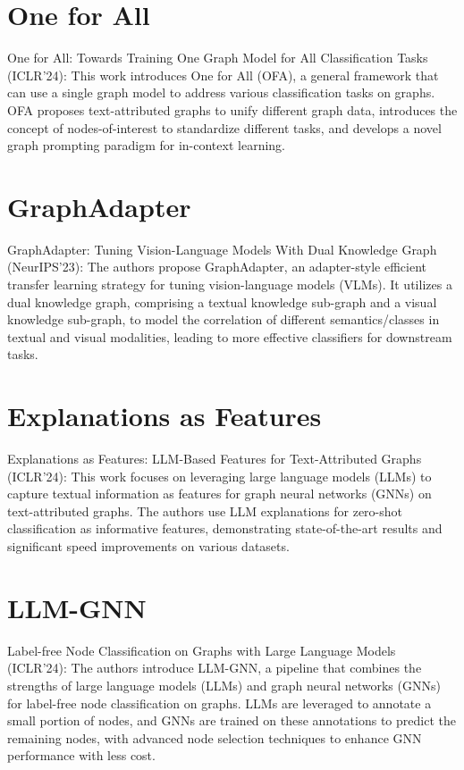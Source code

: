 \documentclass{sigkddExp}
\begin{document}
\section{One for All}
\vspace{3mm}
One for All: Towards Training One Graph Model for All Classification Tasks (ICLR'24): 
This work introduces One for All (OFA), a general framework that can use a single graph model to address various classification tasks on graphs. OFA proposes text-attributed graphs to unify different graph data, introduces the concept of nodes-of-interest to standardize different tasks, and develops a novel graph prompting paradigm for in-context learning.

\section{GraphAdapter}
\vspace{3mm}
GraphAdapter: Tuning Vision-Language Models With Dual Knowledge Graph (NeurIPS'23): 
The authors propose GraphAdapter, an adapter-style efficient transfer learning strategy for tuning vision-language models (VLMs). It utilizes a dual knowledge graph, comprising a textual knowledge sub-graph and a visual knowledge sub-graph, to model the correlation of different semantics/classes in textual and visual modalities, leading to more effective classifiers for downstream tasks.

\section{Explanations as Features}
\vspace{3mm}
Explanations as Features: LLM-Based Features for Text-Attributed Graphs (ICLR'24): 
This work focuses on leveraging large language models (LLMs) to capture textual information as features for graph neural networks (GNNs) on text-attributed graphs. The authors use LLM explanations for zero-shot classification as informative features, demonstrating state-of-the-art results and significant speed improvements on various datasets.

\section{LLM-GNN}
\vspace{3mm}
Label-free Node Classification on Graphs with Large Language Models (ICLR'24): 
The authors introduce LLM-GNN, a pipeline that combines the strengths of large language models (LLMs) and graph neural networks (GNNs) for label-free node classification on graphs. LLMs are leveraged to annotate a small portion of nodes, and GNNs are trained on these annotations to predict the remaining nodes, with advanced node selection techniques to enhance GNN performance with less cost.
\end{document}
